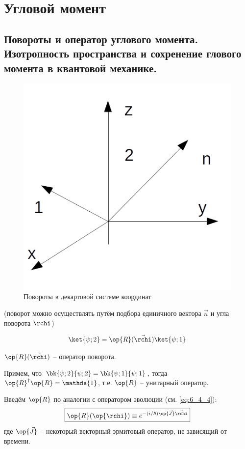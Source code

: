 \chapter{Угловой момент}

\section{Повороты и оператор углового момента. Изотропность пространства и сохренение глового момента в квантовой механике.}

\begin{figure}[h]
  \centering
  \includegraphics[scale=0.6]{figs/8_1}
  \caption{Повороты в декартовой системе координат}
  \label{fig:8_1}
\end{figure}

(поворот можно осуществлять путём подбора единичного вектора $\vec{n}$ и угла поворота $\rchi$)

$$
\ket{\psi;2} = \op{R}(\vec{\rchi}) \ket{\psi;1}
$$

$\op{R}(\vec{\rchi})$ -- оператор поворота.

Примем, что $\bk{\psi;2}{\psi;2} = \bk{\psi;1}{\psi;1}$, тогда $\op{R}^\dag \op{R} = \mathds{1}$, т.е. $\op{R}$ -- унитарный оператор.

Введём $\op{R}$ по аналогии с оператором эволюции (см. \eqref{eq:6_4_4}):
\begin{equation}
\label{eq:8_1_1}
\boxed {
	\op{R}(\op{\rchi}) \equiv e^{-(i/\hbar) \op{\vec{J}} \vec{\rchi}}
}
\end{equation}
где $\op{\vec{J}}$ -- некоторый векторный эрмитовый оператор, не зависящий от времени.

